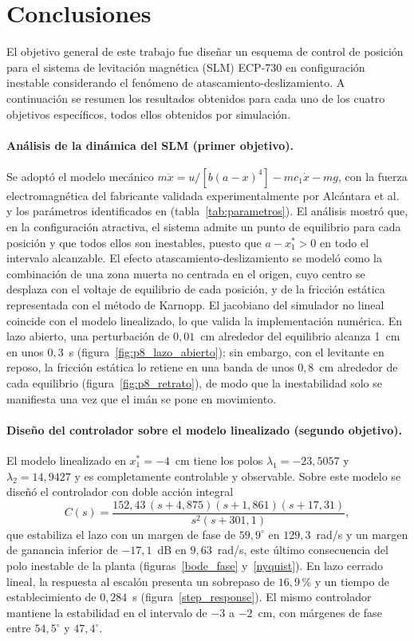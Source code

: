 \section{Conclusiones}

El objetivo general de este trabajo fue diseñar un esquema de control de posición para el sistema de levitación magnética (SLM) ECP-730 en configuración inestable considerando el fenómeno de atascamiento-deslizamiento. A continuación se resumen los resultados obtenidos para cada uno de los cuatro objetivos específicos, todos ellos obtenidos por simulación.

\paragraph{Análisis de la dinámica del SLM (primer objetivo).}
Se adoptó el modelo mecánico $m\ddot{x} = u/[b(a-x)^4] - m c_1\dot{x} - mg$, con la fuerza electromagnética del fabricante validada experimentalmente por Alcántara et al.\ \cite{alcantara} y los parámetros identificados en \cite{diana_tesis} (tabla~\ref{tab:parametros}). El análisis mostró que, en la configuración atractiva, el sistema admite un punto de equilibrio para cada posición y que todos ellos son inestables, puesto que $a - x_1^* > 0$ en todo el intervalo alcanzable. El efecto atascamiento-deslizamiento se modeló como la combinación de una zona muerta no centrada en el origen, cuyo centro se desplaza con el voltaje de equilibrio de cada posición, y de la fricción estática representada con el método de Karnopp. El jacobiano del simulador no lineal coincide con el modelo linealizado, lo que valida la implementación numérica. En lazo abierto, una perturbación de $0{,}01$~cm alrededor del equilibrio alcanza 1~cm en unos $0{,}3$~s (figura~\ref{fig:p8_lazo_abierto}); sin embargo, con el levitante en reposo, la fricción estática lo retiene en una banda de unos $0{,}8$~cm alrededor de cada equilibrio (figura~\ref{fig:p8_retrato}), de modo que la inestabilidad solo se manifiesta una vez que el imán se pone en movimiento.

\paragraph{Diseño del controlador sobre el modelo linealizado (segundo objetivo).}
El modelo linealizado en $x_1^*=-4$~cm tiene los polos $\lambda_1=-23{,}5057$ y $\lambda_2=14{,}9427$ y es completamente controlable y observable. Sobre este modelo se diseñó el controlador con doble acción integral
\[
C(s)=\frac{152{,}43\,(s+4{,}875)(s+1{,}861)(s+17{,}31)}{s^{2}(s+301{,}1)},
\]
que estabiliza el lazo con un margen de fase de $59{,}9^\circ$ en $129{,}3$~rad/s y un margen de ganancia inferior de $-17{,}1$~dB en $9{,}63$~rad/s, este último consecuencia del polo inestable de la planta (figuras~\ref{bode_fase} y~\ref{nyquist}). En lazo cerrado lineal, la respuesta al escalón presenta un sobrepaso de $16{,}9$\,\% y un tiempo de establecimiento de $0{,}284$~s (figura~\ref{step_response}). El mismo controlador mantiene la estabilidad en el intervalo de $-3$ a $-2$~cm, con márgenes de fase entre $54{,}5^\circ$ y $47{,}4^\circ$.


